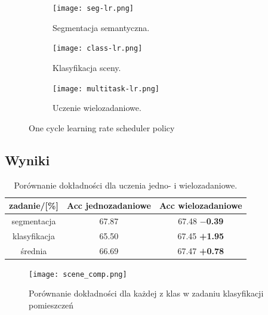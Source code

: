 \begin{figure}[ht!]
    \centering
    \begin{subfigure}[b]{0.32\textwidth}
        \centering
        \texttt{[image: seg-lr.png]}
        \caption{Segmentacja semantyczna.}
    \end{subfigure}
    \hfill
    \begin{subfigure}[b]{0.32\textwidth}
        \centering
        \texttt{[image: class-lr.png]}
        \caption{Klasyfikacja sceny.}
    \end{subfigure}
    \hfill
    \begin{subfigure}[b]{0.32\textwidth}
        \centering
        \texttt{[image: multitask-lr.png]}
        \caption{Uczenie wielozadaniowe.}
    \end{subfigure}
    \caption[]{One cycle learning rate scheduler policy}
    \label{fig:one-cycle-policy}
\end{figure}
\subsection{Wyniki}

\begin{table}[]
    \centering
    \begin{tabular}{c|cc}
        zadanie/{[}\%{]} & Acc jednozadaniowe & Acc wielozadaniowe \\ \hline
        segmentacja      & 67.87               & 67.48  \footnotesize{\textbf{$-$0.39}}        \\
        klasyfikacja     & 65.50               & 67.45  \footnotesize{\textbf{+1.95}}        \\ \hline
    średnia          & 66.69               & 67.47  \footnotesize{\textbf{+0.78}}       
\end{tabular}
\caption{Porównanie dokładności dla uczenia jedno- i wielozadaniowe.}
\label{tab:acc-por}
\end{table}

\begin{figure}[ht!]
    \centering
    \texttt{[image: scene\_comp.png]}
    \caption{Porównanie dokładności dla każdej z klas w zadaniu klasyfikacji pomieszczeń}
    \label{fig:scene_comp}
\end{figure}

